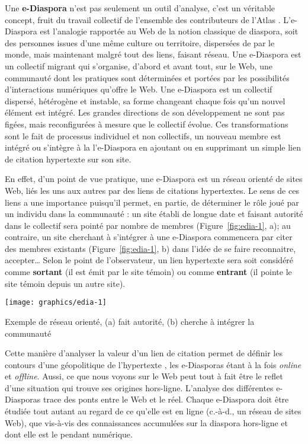 \documentclass[symmetric,justified,marginals=raggedouter]{tufte-book}
\begin{document}
Une \textbf{e-Diaspora} n'est pas seulement un outil d'analyse, c'est un véritable concept, fruit du travail collectif de l'ensemble des contributeurs de l'Atlas \citep{diminescu_introduction:_2012}. L'e-Diaspora est l'analogie rapportée au Web de la notion classique de diaspora, soit des personnes issues d'une même culture ou territoire, dispersées de par le monde, mais maintenant malgré tout des liens, faisant réseau. Une e-Diaspora est un collectif migrant qui s'organise, d'abord et avant tout, sur le Web, une communauté dont les pratiques sont déterminées et portées par les possibilités d'interactions numériques qu'offre le Web. Une e-Diaspora est un collectif dispersé, hétérogène et instable, sa forme changeant chaque fois qu'un nouvel élément est intégré. Les grandes directions de son développement ne sont pas figées, mais reconfigurées à mesure que le collectif évolue. Ces transformations sont le fait de processus individuel et non collectifs, un nouveau membre est intégré ou s'intègre à la l'e-Diaspora en ajoutant ou en supprimant un simple lien de citation hypertexte sur son site. 

En effet, d'un point de vue pratique, une e-Diaspora est un réseau orienté de sites Web, liés les uns aux autres par des liens de citations hypertextes. Le sens de ces liens a une importance puisqu'il permet, en partie, de déterminer le rôle joué par un individu dans la communauté : un site établi de longue date et faisant autorité dans le collectif sera pointé par nombre de membres (Figure~\ref{fig:edia-1}, a); au contraire, un site cherchant à s'intégrer à une e-Diaspora commencera par citer des membres existants (Figure~\ref{fig:edia-1}, b) dans l'idée de se faire reconnaitre, accepter\ldots{} Selon le point de l'observateur, un lien hypertexte sera soit considéré comme \textbf{sortant} (il est émit par le site témoin) ou comme \textbf{entrant} (il pointe le site témoin depuis un autre site). 

\begin{marginfigure}%
  \texttt{[image: graphics/edia-1]}
  \vspace*{0.2cm}  
  \caption{Exemple de réseau orienté, (a) fait autorité, (b) cherche à intégrer la communauté}
  \label{fig:edia-1}
\end{marginfigure}  

Cette manière d'analyser la valeur d'un lien de citation permet de définir les contours d'une géopolitique de l'hypertexte \citep{rogers_national_2013}, les e-Diasporas étant à la fois \textit{online} et \textit{offline}. Aussi, ce que nous voyons sur le Web peut tout à fait être le reflet d'une situation qui trouve ses origines hors-ligne. L'analyse des différentes e-Diasporas trace des ponts entre le Web et le réel. Chaque e-Diaspora doit être étudiée tout autant au regard de ce qu'elle est en ligne (c.-à-d., un réseau de sites Web), que vis-à-vis des connaissances accumulées sur la diaspora hors-ligne et dont elle est le pendant numérique.    
\end{document}
